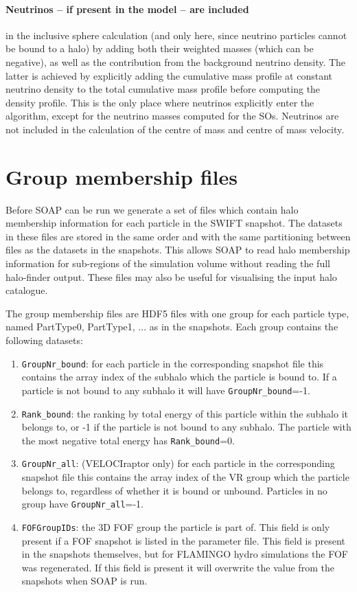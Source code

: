 \documentclass{article}
\begin{document}
\paragraph{Neutrinos -- if present in the model -- are included} in the inclusive sphere calculation (and only 
here, since neutrino particles cannot be bound to a halo) by adding both their weighted masses (which can be 
negative), as well as the contribution from the background neutrino density. The latter is achieved by 
explicitly adding the cumulative mass profile at constant neutrino density to the total cumulative mass 
profile before computing the density profile. This is the only place where neutrinos explicitly enter the 
algorithm, except for the neutrino masses computed for the SOs. Neutrinos are not included in the calculation 
of the centre of mass and centre of mass velocity.

\section{Group membership files}

Before SOAP can be run we generate a set of files which contain halo
membership information for each particle in the SWIFT snapshot. The
datasets in these files are stored in the same order and with the same
partitioning between files as the datasets in the snapshots. This
allows SOAP to read halo membership information for sub-regions of the
simulation volume without reading the full halo-finder output. These files may
also be useful for visualising the input halo catalogue.

The group membership files are HDF5 files with one group for each
particle type, named PartType0, PartType1, ... as in the
snapshots. Each group contains the following datasets:

\begin{enumerate}
\item \verb|GroupNr_bound|: for each particle in the corresponding snapshot
  file this contains the array index of the subhalo which the
  particle is bound to. If a particle is not bound to any subhalo it
  will have \verb|GroupNr_bound|=-1.
\item \verb|Rank_bound|: the ranking by total energy of this particle within
  the subhalo it belongs to, or -1 if the particle is not bound to
  any subhalo. The particle with the most negative total energy has
  \verb|Rank_bound|=0.
\item \verb|GroupNr_all|: (VELOCIraptor only) for each particle in the
  corresponding snapshot
  file this contains the array index of the VR group which the
  particle belongs to, regardless of whether it is bound or
  unbound. Particles in no group have \verb|GroupNr_all|=-1.
\item \verb|FOFGroupIDs|: the 3D FOF group the particle is part of.
  This field is only present if a FOF snapshot is listed in the
  parameter file. This field is present in the snapshots themselves,
  but for FLAMINGO hydro simulations the FOF was regenerated. If this
  field is present it will overwrite the value from the snapshots when
  SOAP is run.
\end{enumerate}
\end{document}
